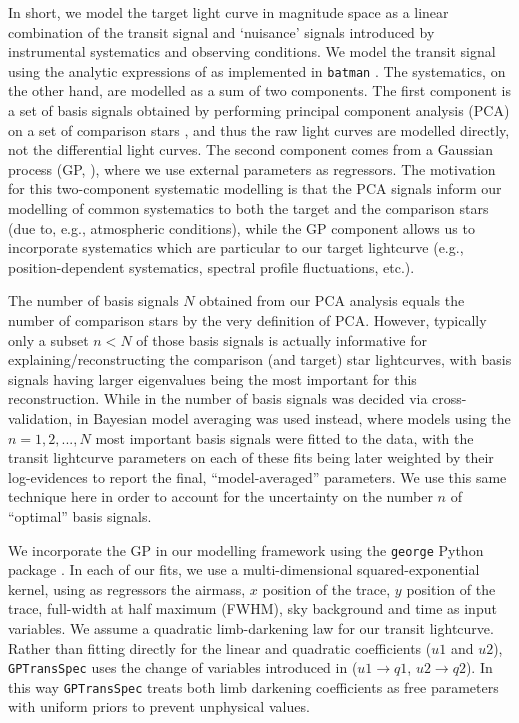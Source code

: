 \documentclass[twocolumn]{aastex63}
\begin{document}
In short, we model the target light curve in magnitude space as a linear combination of the transit signal 
and `nuisance' signals introduced by instrumental systematics and observing conditions. We model the transit 
signal using the analytic expressions of \cite{Mandel2002} as implemented in \texttt{batman} \citep{batman}. The systematics, on the other hand, are modelled as a sum of two components. 
The first component is a set of basis signals obtained by performing principal 
component analysis (PCA) on a set of comparison stars \citep[see][for details]{Jordan2013, Espinoza2019}, and thus the raw light curves are modelled directly, not the differential light curves. The second component comes from a Gaussian process (GP, \citealp[e.g.,][]{Gibson2012}), where we use external parameters as regressors. The motivation for this two-component systematic modelling is that the
PCA signals inform our modelling of common systematics to both the target and the comparison stars 
(due to, e.g., atmospheric conditions), while the GP component allows us to incorporate 
systematics which are particular to our target lightcurve (e.g., position-dependent systematics, 
spectral profile fluctuations, etc.).

The number of basis signals $N$ obtained from our PCA analysis equals the number of 
comparison stars by the very definition of PCA. However, typically only a subset $n<N$ of 
those basis signals is actually informative for explaining/reconstructing the comparison (and target) 
star lightcurves, with basis signals having larger eigenvalues being the most important for 
this reconstruction. While in \cite{Jordan2013} the number of basis signals was decided via cross-validation, in \cite{Espinoza2019} Bayesian model averaging was used instead, where models 
using the $n = 1,2,...,N$ most important basis signals were fitted to the data, with the 
transit lightcurve parameters on each of these fits being later weighted by their log-evidences to 
report the final, ``model-averaged'' parameters. We use this same technique here in order to 
account for the uncertainty on the number $n$ of ``optimal'' basis signals.

We incorporate the GP in our modelling framework using 
the \texttt{george} Python package \citep{Foreman-Mackey2017}. 
In each of our fits, we use a multi-dimensional squared-exponential kernel, using as regressors 
the airmass, $x$ position of the trace, $y$ position of the trace, full-width at half maximum (FWHM), 
sky background and time as input variables. We assume a quadratic limb-darkening law for our 
transit lightcurve. Rather than fitting directly for the linear and quadratic coefficients ($u1$ and $u2$), \texttt{GPTransSpec} uses the change of variables introduced in \cite{Kipping2013} ($u1 \rightarrow q1$, $u2 \rightarrow q2$). In this way \texttt{GPTransSpec} treats both limb darkening coefficients as free parameters with uniform priors to prevent unphysical values.
\end{document}
